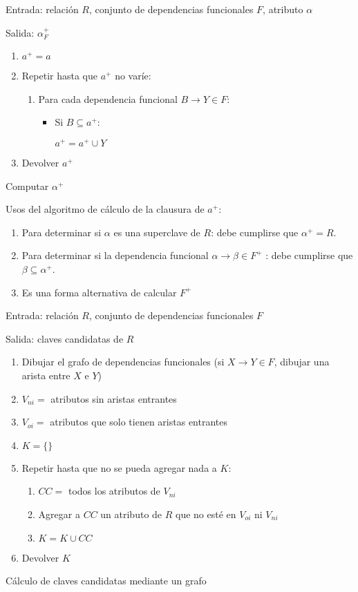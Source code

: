 \documentclass[a4paper, twoside]{article}
\begin{document}
\begin{algorithm}[H]
Entrada: relación $R$, conjunto de dependencias funcionales $F$,
atributo $\alpha$

Salida: $\alpha_{F}^{+}$
\begin{enumerate}
\item $a^{+}=a$
\item Repetir hasta que $a^{+}$ no varíe:

\begin{enumerate}
\item Para cada dependencia funcional $B\to Y\in F$:

\begin{itemize}
\item Si $B\subseteq a^{+}$:


$a^{+}=a^{+}\cup Y$

\end{itemize}
\end{enumerate}
\item Devolver $a^{+}$
\end{enumerate}
\protect\caption{Computar $\alpha^{+}$}
\end{algorithm}


Usos del algoritmo de cálculo de la clausura de $a^{+}$:
\begin{enumerate}
\item Para determinar si $\alpha$ es una superclave de $R$: debe cumplirse
que $\alpha^{+}=R$.
\item Para determinar si la dependencia funcional $\alpha\to\beta\in F^{+}$
: debe cumplirse que $\beta\subseteq\alpha^{+}$.
\item Es una forma alternativa de calcular $F^{+}$
\end{enumerate}
\begin{algorithm}[H]
Entrada: relación $R$, conjunto de dependencias funcionales $F$

Salida: claves candidatas de $R$
\begin{enumerate}
\item Dibujar el grafo de dependencias funcionales (si $X\to Y\in F$, dibujar
una arista entre $X$ e $Y$)
\item $V_{ni}=$ atributos sin aristas entrantes
\item $V_{oi}=$ atributos que solo tienen aristas entrantes
\item $K=\{\}$
\item Repetir hasta que no se pueda agregar nada a $K$:

\begin{enumerate}
\item $CC=$ todos los atributos de $V_{ni}$
\item Agregar a $CC$ un atributo de $R$ que no esté en $V_{oi}$ ni $V_{ni}$
\item $K=K\cup CC$
\end{enumerate}
\item Devolver $K$
\end{enumerate}
\protect\caption{Cálculo de claves candidatas mediante un grafo}
\end{algorithm}
\end{document}
